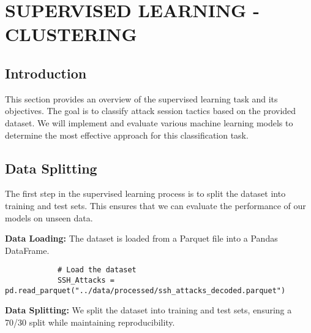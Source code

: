 

\section{SUPERVISED LEARNING - CLUSTERING}


    \subsection{Introduction}
    
        This section provides an overview of the supervised learning task and its objectives. The goal is to classify attack session tactics based on the provided dataset. We will implement and evaluate various machine learning models to determine the most effective approach for this classification task.

    \subsection{Data Splitting}
    
        The first step in the supervised learning process is to split the dataset into training and test sets. This ensures that we can evaluate the performance of our models on unseen data.

        \textbf{Data Loading:} The dataset is loaded from a Parquet file into a Pandas DataFrame.

        \begin{verbatim}
            # Load the dataset
            SSH_Attacks = pd.read_parquet("../data/processed/ssh_attacks_decoded.parquet")
        \end{verbatim}

        \textbf{Data Splitting:} We split the dataset into training and test sets, ensuring a 70/30 split while maintaining reproducibility.

